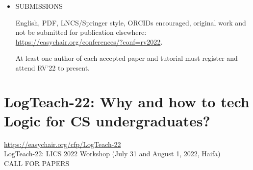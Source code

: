 \documentclass[prodmode,acmtecs]{acmsmall} %
\begin{document}
\begin{itemize}
\item  SUBMISSIONS  
 
  English, PDF, LNCS/Springer style, ORCIDs encouraged, original work and not be submitted for publication elsewhere: \href{https://easychair.org/conferences/?conf=rv2022}{https://easychair.org/conferences/?conf=rv2022}. 
 
  At least one author of each accepted paper and tutorial must register and attend RV'22 to present. 
 
\end{itemize}\section{LogTeach-22:  Why and how to tech Logic for CS undergraduates?}\label{LogTeach22}  \href{https://easychair.org/cfp/LogTeach-22}{https://easychair.org/cfp/LogTeach-22}\\ 
  LogTeach-22: LICS 2022 Workshop (July 31 and August 1, 2022, Haifa)\\ 
CALL FOR PAPERS 
\end{document}
